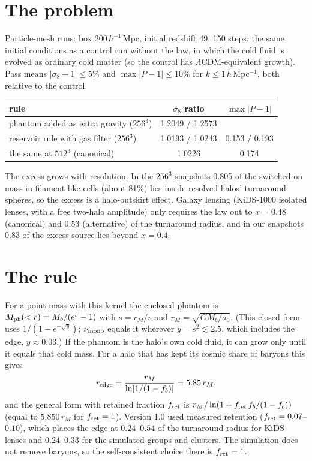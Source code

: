\documentclass[10pt]{article}
\begin{document}
\section{The problem}
Particle-mesh runs: box $200\,h^{-1}$\,Mpc, initial redshift 49, 150 steps, the same initial conditions as a control run without the law, in which the cold fluid is evolved as ordinary cold matter (so the control has $\Lambda$CDM-equivalent growth). Pass means $|\sigma_8-1|\le5\%$ and $\max|P-1|\le10\%$ for $k\le1\,h$\,Mpc$^{-1}$, both relative to the control.
\begin{center}
\begin{tabular}{lcc}
\toprule
rule & $\sigma_8$ ratio & $\max|P-1|$\\
\midrule
phantom added as extra gravity ($256^3$) & 1.2049 / 1.2573 & \\
reservoir rule with gas filter ($256^3$) & 1.0193 / 1.0243 & 0.153 / 0.193\\
the same at $512^3$ (canonical) & 1.0226 & 0.174\\
\bottomrule
\end{tabular}
\end{center}
The excess grows with resolution. In the $256^3$ snapshots 0.805 of the switched-on mass in filament-like cells (about 81\%) lies inside resolved halos' turnaround spheres, so the excess is a halo-outskirt effect. Galaxy lensing (KiDS-1000 isolated lenses, with a free two-halo amplitude) only requires the law out to $x=0.48$ (canonical) and $0.53$ (alternative) of the turnaround radius, and in our snapshots 0.83 of the excess source lies beyond $x=0.4$.

\section{The rule}
For a point mass with this kernel the enclosed phantom is $M_{\rm ph}(<r)=M_b/(e^{s}-1)$ with $s=r_M/r$ and $r_M=\sqrt{GM_b/a_0}$. (This closed form uses $1/(1-e^{-\sqrt y})$; $\nu_{\rm mono}$ equals it wherever $y=s^2\lesssim2.5$, which includes the edge, $y\approx0.03$.) If the phantom is the halo's own cold fluid, it can grow only until it equals that cold mass. For a halo that has kept its cosmic share of baryons this gives
\[ r_{\rm edge}=\frac{r_M}{\ln[1/(1-f_b)]}=5.85\,r_M ,\]
and the general form with retained fraction $f_{\rm ret}$ is $r_M/\ln(1+f_{\rm ret}\,f_b/(1-f_b))$ (equal to $5.850\,r_M$ for $f_{\rm ret}=1$). Version 1.0 used measured retention ($f_{\rm ret}=0.07$--$0.10$), which places the edge at $0.24$--$0.54$ of the turnaround radius for KiDS lenses and $0.24$--$0.33$ for the simulated groups and clusters. The simulation does not remove baryons, so the self-consistent choice there is $f_{\rm ret}=1$.
\end{document}
